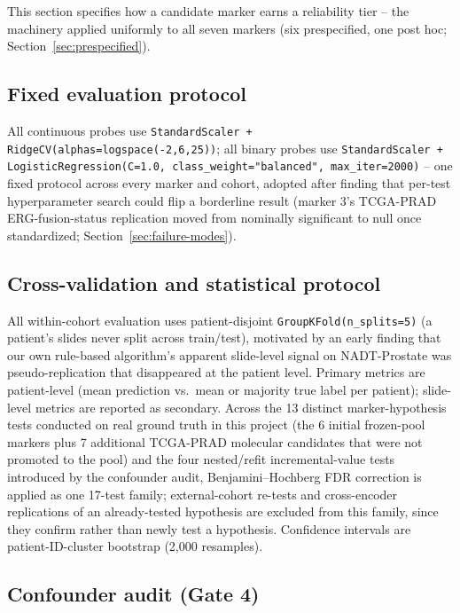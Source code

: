 \label{sec:gates}

This section specifies how a candidate marker earns a reliability tier -- the machinery applied
uniformly to all seven markers (six prespecified, one post hoc; Section~\ref{sec:prespecified}).

\subsection{Fixed evaluation protocol}

All continuous probes use \texttt{StandardScaler + RidgeCV(alphas=logspace(-2,6,25))}; all
binary probes use \texttt{StandardScaler + LogisticRegression(C=1.0, class\_weight="balanced",
max\_iter=2000)} -- one fixed protocol across every marker and cohort, adopted after finding
that per-test hyperparameter search could flip a borderline result (marker 3's TCGA-PRAD
ERG-fusion-status replication moved from nominally significant to null once standardized;
Section~\ref{sec:failure-modes}).

\subsection{Cross-validation and statistical protocol}

All within-cohort evaluation uses patient-disjoint \texttt{GroupKFold(n\_splits=5)} (a
patient's slides never split across train/test), motivated by an early finding that our own
rule-based algorithm's apparent slide-level signal on NADT-Prostate was pseudo-replication that
disappeared at the patient level. Primary metrics are patient-level (mean prediction vs.\ mean
or majority true label per patient); slide-level metrics are reported as secondary. Across the
13 distinct marker-hypothesis tests conducted on real ground truth in this project (the 6
initial frozen-pool markers plus 7 additional TCGA-PRAD molecular candidates that were not
promoted to the pool) and the four nested/refit incremental-value tests introduced by the
confounder audit, Benjamini--Hochberg FDR correction is applied as one 17-test family;
external-cohort re-tests and cross-encoder replications of an already-tested hypothesis are
excluded from this family, since they confirm rather than newly test a hypothesis. Confidence
intervals are patient-ID-cluster bootstrap (2{,}000 resamples).

\subsection{Confounder audit (Gate 4)}
\label{sec:gate4-methods}

